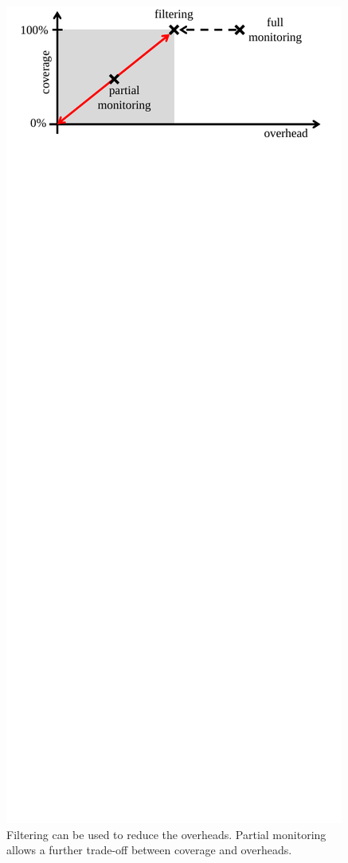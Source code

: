 \begin{figure}
  \begin{center}
    \includegraphics[width=\columnwidth]{figs/optimization_overview.pdf}
    \vspace{-0.2in}
    \caption{Filtering can be used to reduce the overheads. Partial monitoring
    allows a further trade-off between coverage and overheads.}
    \label{fig:optimizations.overview}
    \vspace{-0.1in}
  \end{center}
\end{figure}

